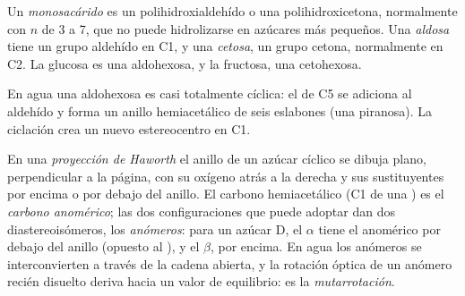 \begin{definition}[Monosacáridos]\label{def:b2:biomolecules:sugar}
Un \emph{monosacárido} es un polihidroxialdehído o una polihidroxicetona, normalmente
 con $n$ de 3 a 7, que no puede hidrolizarse en azúcares más pequeños. Una
\emph{aldosa} tiene un grupo aldehído en C1, y una \emph{cetosa}, un grupo cetona,
normalmente en C2. La glucosa es una aldohexosa, y la fructosa, una cetohexosa.
\end{definition}

En agua una aldohexosa es casi totalmente cíclica: el  de C5 se adiciona al aldehído y forma un
anillo hemiacetálico de seis eslabones (una piranosa). La ciclación crea un nuevo estereocentro en C1.

\begin{definition}[Anómeros]\label{def:b2:biomolecules:anomer}
En una \emph{proyección de Haworth} el anillo de un azúcar cíclico se dibuja plano,
perpendicular a la página, con su oxígeno atrás a la derecha y sus sustituyentes por encima o por debajo del
anillo. El carbono hemiacetálico (C1 de una ) es el \emph{carbono anomérico}; las
dos configuraciones que puede adoptar dan dos diastereoisómeros, los \emph{anómeros}: para un azúcar
D, el $\alpha$ tiene el  anomérico por debajo del anillo (opuesto al ), y el $\beta$, por encima. En
agua los anómeros se interconvierten a través de la cadena abierta, y la rotación óptica de un anómero recién
disuelto deriva hacia un valor de equilibrio: es la \emph{mutarrotación}.
\end{definition}

